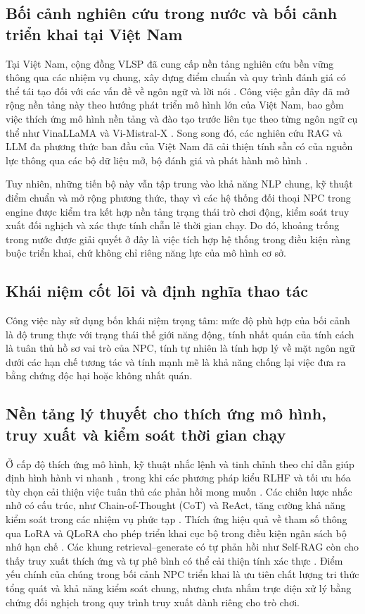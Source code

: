 ﻿\documentclass[a4paper,12pt]{article}
\begin{document}
\subsection{Bối cảnh nghiên cứu trong nước và bối cảnh triển khai tại Việt Nam}
Tại Việt Nam, cộng đồng VLSP đã cung cấp nền tảng nghiên cứu bền vững thông qua các nhiệm vụ chung, xây dựng điểm chuẩn và quy trình đánh giá có thể tái tạo đối với các vấn đề về ngôn ngữ và lời nói \cite{VLSP2025Proceedings,Ha2025VLSPSemanticParsing}. Công việc gần đây đã mở rộng nền tảng này theo hướng phát triển mô hình lớn của Việt Nam, bao gồm việc thích ứng mô hình nền tảng và đào tạo trước liên tục theo từng ngôn ngữ cụ thể như VinaLLaMA và Vi-Mistral-X \cite{VinaLLaMA2023,ViMistralX2024}. Song song đó, các nghiên cứu RAG và LLM đa phương thức ban đầu của Việt Nam đã cải thiện tính sẵn có của nguồn lực thông qua các bộ dữ liệu mở, bộ đánh giá và phát hành mô hình \cite{Duc2024VietnamRAG,LaVy2024}.

Tuy nhiên, những tiến bộ này vẫn tập trung vào khả năng NLP chung, kỹ thuật điểm chuẩn và mở rộng phương thức, thay vì các hệ thống đối thoại NPC trong engine được kiểm tra kết hợp nền tảng trạng thái trò chơi động, kiểm soát truy xuất đối nghịch và xác thực tính chẵn lẻ thời gian chạy. Do đó, khoảng trống trong nước được giải quyết ở đây là việc tích hợp hệ thống trong điều kiện ràng buộc triển khai, chứ không chỉ riêng năng lực của mô hình cơ sở.

\subsection{Khái niệm cốt lõi và định nghĩa thao tác}
Công việc này sử dụng bốn khái niệm trọng tâm: mức độ phù hợp của bối cảnh là độ trung thực với trạng thái thế giới năng động, tính nhất quán của tính cách là tuân thủ hồ sơ vai trò của NPC, tính tự nhiên là tính hợp lý về mặt ngôn ngữ dưới các hạn chế tương tác và tính mạnh mẽ là khả năng chống lại việc đưa ra bằng chứng độc hại hoặc không nhất quán.

\subsection{Nền tảng lý thuyết cho thích ứng mô hình, truy xuất và kiểm soát thời gian chạy}
Ở cấp độ thích ứng mô hình, kỹ thuật nhắc lệnh và tinh chỉnh theo chỉ dẫn giúp định hình hành vi nhanh \cite{Liu2021PromptSurvey}, trong khi các phương pháp kiểu RLHF và tối ưu hóa tùy chọn cải thiện việc tuân thủ các phản hồi mong muốn \cite{Ouyang2022InstructGPT,Rafailov2023DPO}. Các chiến lược nhắc nhở có cấu trúc, như Chain-of-Thought (CoT) và ReAct, tăng cường khả năng kiểm soát trong các nhiệm vụ phức tạp \cite{Wei2022CoT,Yao2023ReAct}. Thích ứng hiệu quả về tham số thông qua LoRA và QLoRA cho phép triển khai cục bộ trong điều kiện ngân sách bộ nhớ hạn chế \cite{Hu2021LoRA,Dettmers2023QLoRA}. Các khung retrieval--generate có tự phản hồi như Self-RAG còn cho thấy truy xuất thích ứng và tự phê bình có thể cải thiện tính xác thực \cite{Asai2024SelfRAG}. Điểm yếu chính của chúng trong bối cảnh NPC triển khai là ưu tiên chất lượng tri thức tổng quát và khả năng kiểm soát chung, nhưng chưa nhắm trực diện xử lý bằng chứng đối nghịch trong quy trình truy xuất dành riêng cho trò chơi.
\end{document}
